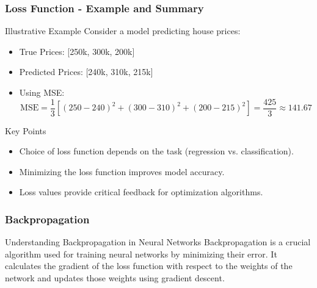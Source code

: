 \documentclass[aspectratio=169]{beamer}
\begin{document}
\begin{frame}[fragile]
    \frametitle{Loss Function - Example and Summary}
    \begin{block}{Illustrative Example}
        Consider a model predicting house prices:
        \begin{itemize}
            \item True Prices: [250k, 300k, 200k]
            \item Predicted Prices: [240k, 310k, 215k]
            \item Using MSE:
            \begin{equation}
                \text{MSE} = \frac{1}{3}[(250 - 240)^2 + (300 - 310)^2 + (200 - 215)^2] = \frac{425}{3} \approx 141.67
            \end{equation}
        \end{itemize}
    \end{block}
    \begin{block}{Key Points}
        \begin{itemize}
            \item Choice of loss function depends on the task (regression vs. classification).
            \item Minimizing the loss function improves model accuracy.
            \item Loss values provide critical feedback for optimization algorithms.
        \end{itemize}
    \end{block}
\end{frame}

\begin{frame}[fragile]
  \frametitle{Backpropagation}
  \begin{block}{Understanding Backpropagation in Neural Networks}
    Backpropagation is a crucial algorithm used for training neural networks by minimizing their error. It calculates the gradient of the loss function with respect to the weights of the network and updates those weights using gradient descent.
  \end{block}
\end{frame}
\end{document}
